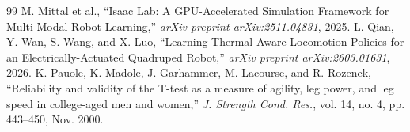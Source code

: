 \documentclass[10pt,twocolumn]{ICCAS}
\begin{document}
\begin{thebibliography}{99}
M. Mittal et al., ``Isaac Lab: A GPU-Accelerated Simulation Framework for Multi-Modal Robot Learning,'' \textit{arXiv preprint arXiv:2511.04831}, 2025.
L. Qian, Y. Wan, S. Wang, and X. Luo, ``Learning Thermal-Aware Locomotion Policies for an Electrically-Actuated Quadruped Robot,'' \textit{arXiv preprint arXiv:2603.01631}, 2026.
K. Pauole, K. Madole, J. Garhammer, M. Lacourse, and R. Rozenek, ``Reliability and validity of the T-test as a measure of agility, leg power, and leg speed in college-aged men and women,'' \textit{J. Strength
Cond. Res.}, vol. 14, no. 4, pp. 443--450, Nov. 2000.

\end{thebibliography}
%
\end{document}
